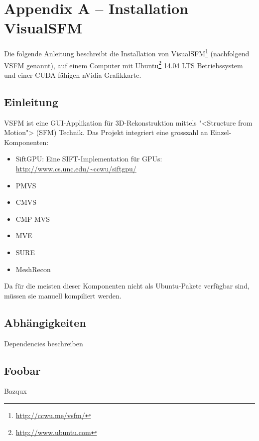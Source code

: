 \chapter{Appendix A -- Installation VisualSFM}

\label{ch:installing-vsfm}


Die folgende Anleitung beschreibt die Installation von
VisualSFM\footnote{\url{http://ccwu.me/vsfm/}} (nachfolgend VSFM genannt), auf
einem Computer mit Ubuntu\footnote{\url{http://www.ubuntu.com}} 14.04 LTS
Betriebssystem und einer CUDA-fähigen nVidia Grafikkarte.


\section{Einleitung}

VSFM ist eine GUI-Applikation für 3D-Rekonstruktion mittels "<Structure from
Motion"> (SFM) Technik. Das Projekt integriert eine grosszahl an
Einzel-Komponenten:

\begin{itemize}
	\item SiftGPU: Eine SIFT\cite{lowe:2004}-Implementation für GPUs:
		\url{http://www.cs.unc.edu/~ccwu/siftgpu/}
	\item PMVS
	\item CMVS
	\item CMP-MVS
	\item MVE
	\item SURE
	\item MeshRecon
\end{itemize}

\noindent Da für die meisten dieser Komponenten nicht als Ubuntu-Pakete
verfügbar sind, müssen sie manuell kompiliert werden.


\section{Abhängigkeiten}

Dependencies beschreiben


\section{Foobar}

Bazqux
